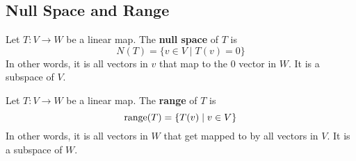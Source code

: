 \documentclass{article}
\begin{document}
\subsection{Null Space and Range}
\begin{definition}
  Let $T: V \to W$ be a linear map. The \textbf{null space} of $T$ is \[
    N(T) = \{v \in V \mid T(v) = 0\}
  \]
  In other words, it is all vectors in $v$ that map to the $0$ vector in $W$.
  It is a subspace of $V$.
\end{definition}
\begin{definition}
  Let $T: V \to W$ be a linear map. The \textbf{range} of $T$ is \[
    \operatorname{\text{range}}(T) = \{T(v) \mid v \in V\}
  \]
  In other words, it is all vectors in $W$ that get mapped to by all vectors in $V$.
  It is a subspace of $W$.
\end{definition}
\end{document}
